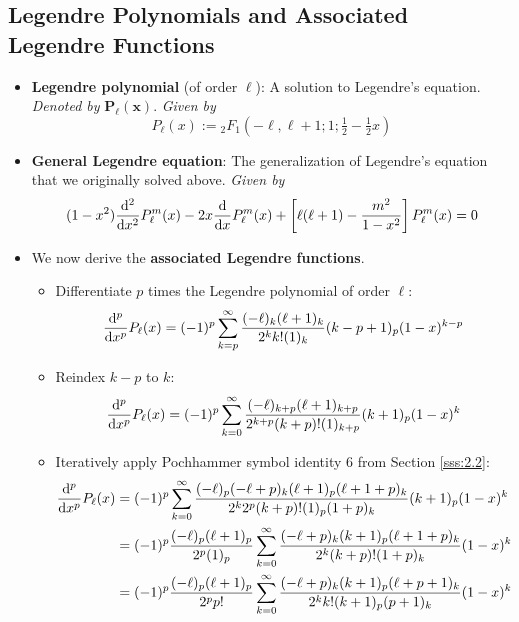 \documentclass[../finalProject.tex]{subfiles}
\begin{document}
\subsection{Legendre Polynomials and Associated Legendre Functions}
\begin{itemize}
    \item \textbf{Legendre polynomial} (of order $\ell$): A solution to Legendre's equation. \emph{Denoted by} $\bm{P_\ell(x)}$. \emph{Given by}
    \begin{equation*}
        P_\ell(x) := {}_2F_1(-\ell,\ell+1;1;\tfrac{1}{2}-\tfrac{1}{2}x)
    \end{equation*}
    \item \textbf{General Legendre equation}: The generalization of Legendre's equation that we originally solved above. \emph{Given by}
    \begin{equation*}
        (1-x^2)\dv[2]{x}P_\ell^m(x)-2x\dv{x}P_\ell^m(x)+\left[ \ell(\ell+1)-\frac{m^2}{1-x^2} \right]P_\ell^m(x) = 0
    \end{equation*}
    \item We now derive the \textbf{associated Legendre functions}.
    \begin{itemize}
        \item Differentiate $p$ times the Legendre polynomial of order $\ell$:
        \begin{equation*}
            \dv[p]{x}P_\ell(x) = (-1)^p\sum_{k=p}^\infty\frac{(-\ell)_k(\ell+1)_k}{2^kk!(1)_k}(k-p+1)_p(1-x)^{k-p}
        \end{equation*}
        \item Reindex $k-p$ to $k$:
        \begin{equation*}
            \dv[p]{x}P_\ell(x) = (-1)^p\sum_{k=0}^\infty\frac{(-\ell)_{k+p}(\ell+1)_{k+p}}{2^{k+p}(k+p)!(1)_{k+p}}(k+1)_p(1-x)^k
        \end{equation*}
        \item Iteratively apply Pochhammer symbol identity 6 from Section \ref{sss:2.2}:
        \begin{align*}
            \dv[p]{x}P_\ell(x) &= (-1)^p\sum_{k=0}^\infty\frac{(-\ell)_p(-\ell+p)_k(\ell+1)_p(\ell+1+p)_k}{2^k2^p(k+p)!(1)_p(1+p)_k}(k+1)_p(1-x)^k\\
            &= (-1)^p\frac{(-\ell)_p(\ell+1)_p}{2^p(1)_p}\sum_{k=0}^\infty\frac{(-\ell+p)_k(k+1)_p(\ell+1+p)_k}{2^k(k+p)!(1+p)_k}(1-x)^k\\
            &= (-1)^p\frac{(-\ell)_p(\ell+1)_p}{2^pp!}\sum_{k=0}^\infty\frac{(-\ell+p)_k(k+1)_p(\ell+p+1)_k}{2^kk!(k+1)_p(p+1)_k}(1-x)^k\\

\end{align*}
\end{itemize}
\end{itemize}
\end{document}
